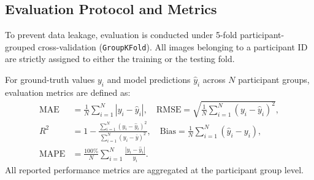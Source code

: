 \documentclass[conference]{IEEEtran}
\begin{document}
\begin{table}[t]
\caption{System Runtime Configuration Parameters}
\label{tab:config}
\centering
{}
\end{table}

\subsection{Evaluation Protocol and Metrics}
To prevent data leakage, evaluation is conducted under 5-fold participant-grouped cross-validation (\texttt{GroupKFold}). All images belonging to a participant ID are strictly assigned to either the training or the testing fold.

For ground-truth values $y_i$ and model predictions $\hat{y}_i$ across $N$ participant groups, evaluation metrics are defined as:
\begin{align}
\text{MAE} &= \frac{1}{N} \sum_{i=1}^{N} |y_i - \hat{y}_i|, \quad
\text{RMSE} = \sqrt{\frac{1}{N} \sum_{i=1}^{N} (y_i - \hat{y}_i)^2}, \\
R^2 &= 1 - \frac{\sum_{i=1}^{N} (y_i - \hat{y}_i)^2}{\sum_{i=1}^{N} (y_i - \bar{y})^2}, \quad
\text{Bias} = \frac{1}{N} \sum_{i=1}^{N} (\hat{y}_i - y_i), \\
\text{MAPE} &= \frac{100\%}{N} \sum_{i=1}^{N} \frac{|y_i - \hat{y}_i|}{y_i}.
\end{align}
All reported performance metrics are aggregated at the participant group level.
\end{document}

